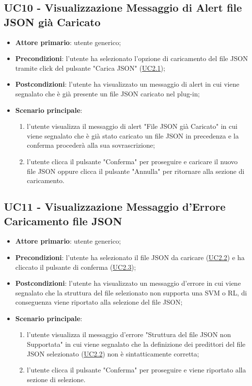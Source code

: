 
	\label{par:UC10}
	\subsection{UC10 - Visualizzazione Messaggio di Alert file JSON già Caricato}
		\begin{itemize}
			\item\textbf{Attore primario}: utente generico;
			\item\textbf{Precondizioni}: l’utente ha selezionato l'opzione di caricamento del file JSON tramite click del pulsante "Carica JSON" (\hyperref[par:UC2.1]{UC2.1});
			\item\textbf{Postcondizioni}: l’utente ha visualizzato un messaggio di alert in cui viene segnalato che è già presente un file JSON caricato nel plug-in;
			\item\textbf{Scenario principale}:
				\begin{enumerate}
					\item l’utente visualizza il messaggio di alert "File JSON già Caricato" in cui viene segnalato che è già stato caricato un file JSON in precedenza e la conferma procederà alla sua sovrascrizione;
					\item l'utente clicca il pulsante "Conferma" per proseguire e caricare il nuovo file JSON oppure clicca il pulsante "Annulla" per ritornare alla sezione di caricamento.
				\end{enumerate}
		\end{itemize}	


	\label{par:UC11}
	\subsection{UC11 - Visualizzazione Messaggio d'Errore Caricamento file JSON }
		\begin{itemize}
			\item\textbf{Attore primario}: utente generico;
			\item\textbf{Precondizioni}: l’utente ha selezionato il file JSON da caricare (\hyperref[par:UC2.2]{UC2.2}) e ha cliccato il pulsante di conferma (\hyperref[par:UC2.3]{UC2.3});
			\item\textbf{Postcondizioni}: l’utente ha visualizzato un messaggio d'errore in cui viene segnalato che la struttura del file selezionato non supporta una SVM o RL, di conseguenza viene riportato alla selezione del file JSON;
			\item\textbf{Scenario principale}:
				\begin{enumerate}
					\item l’utente visualizza il messaggio d'errore "Struttura del file JSON non Supportata" in cui viene segnalato che la definizione dei predittori del file JSON selezionato (\hyperref[par:UC2.2]{UC2.2}) non è sintatticamente corretta;
					\item l'utente clicca il pulsante "Conferma" per proseguire e viene riportato alla sezione di selezione.
				\end{enumerate}
		\end{itemize}	

